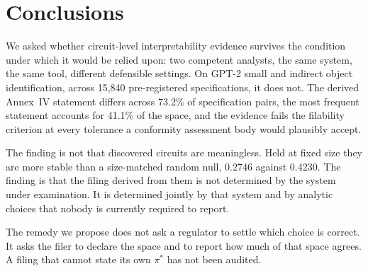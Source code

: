 \documentclass[letterpaper]{article} %
\begin{document}
\section{Conclusions}

We asked whether circuit-level interpretability evidence survives the condition
under which it would be relied upon: two competent analysts, the same system,
the same tool, different defensible settings. On GPT-2 small and indirect object
identification, across 15{,}840 pre-registered specifications, it does not. The
derived Annex~IV statement differs across 73.2\% of specification pairs, the most
frequent statement accounts for 41.1\% of the space, and the evidence fails the
filability
criterion at every tolerance a conformity assessment body would plausibly
accept.

The finding is not that discovered circuits are meaningless. Held at fixed size
they are more stable than a size-matched random null, 0.2746 against 0.4230. The
finding is that the filing derived from them is not determined by the system
under examination. It is determined jointly by that system and by analytic
choices that nobody is currently required to report.

The remedy we propose does not ask a regulator to settle which choice is
correct. It asks the filer to declare the space and to report how much of that
space agrees. A filing that cannot state its own $\pi^{*}$ has not been audited.

%
%
%
\end{document}
